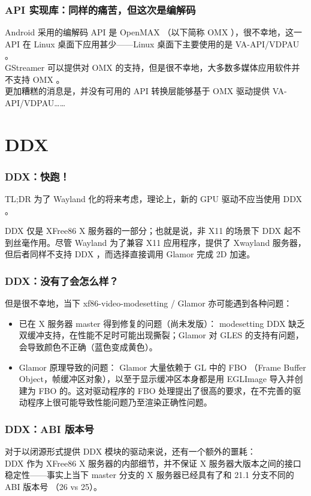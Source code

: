 \documentclass{ctexbeamer}
\begin{document}
\begin{frame}
    \frametitle{API 实现库：同样的痛苦，但这次是编解码}
    Android 采用的编解码 API 是 OpenMAX （以下简称 OMX ），很不幸地，这一 API 在 Linux 桌面下应用甚少——Linux 桌面下主要使用的是 VA-API/VDPAU 。\\
    GStreamer 可以提供对 OMX 的支持，但是很不幸地，大多数多媒体应用软件并不支持 OMX 。\\
    更加糟糕的消息是，并没有可用的 API 转换层能够基于 OMX 驱动提供 VA-API/VDPAU……
\end{frame}

\section{DDX}

\begin{frame}
    \frametitle{DDX：快跑！}
    \begin{alertblock}{TL;DR}
        为了 Wayland 化的将来考虑，理论上，新的 GPU 驱动不应当使用 DDX 。
    \end{alertblock}
    DDX 仅是 XFree86 X 服务器的一部分；也就是说，非 X11 的场景下 DDX 起不到丝毫作用。尽管 Wayland 为了兼容 X11 应用程序，提供了 Xwayland 服务器，但后者同样不支持 DDX ，而选择直接调用 Glamor 完成 2D 加速。
\end{frame}

\begin{frame}
    \frametitle{DDX：没有了会怎么样？}
    但是很不幸地，当下 xf86-video-modesetting / Glamor 亦可能遇到各种问题：
    \begin{itemize}
        \item 已在 X 服务器 master 得到修复的问题（尚未发版）： modesetting DDX 缺乏双缓冲支持，在性能不足时可能出现撕裂；Glamor 对 GLES 的支持有问题，会导致颜色不正确（蓝色变成黄色）。
        \item Glamor 原理导致的问题： Glamor 大量依赖于 GL 中的 FBO （Frame Buffer Object，帧缓冲区对象），以至于显示缓冲区本身都是用 EGLImage 导入并创建为 FBO 的。这对驱动程序的 FBO 处理提出了很高的要求，在不完善的驱动程序上很可能导致性能问题乃至渲染正确性问题。
    \end{itemize}
\end{frame}

\begin{frame}
    \frametitle{DDX：ABI 版本号}
    对于以闭源形式提供 DDX 模块的驱动来说，还有一个额外的噩耗：\\
    DDX 作为 XFree86 X 服务器的内部细节，并不保证 X 服务器大版本之间的接口稳定性——事实上当下 master 分支的 X 服务器已经具有了和 21.1 分支不同的 ABI 版本号 （26 vs 25）。
\end{frame}
\end{document}
